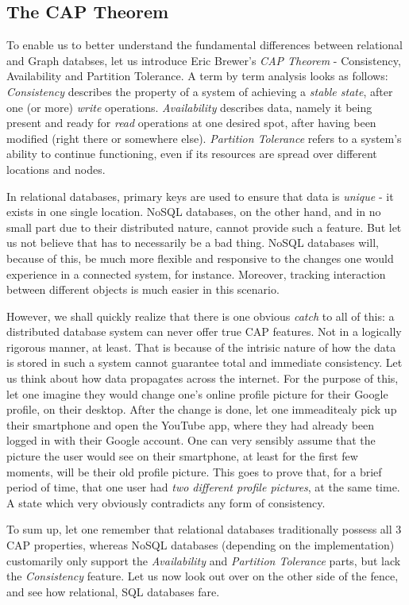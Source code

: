 \documentclass[10pt,        %
               a4paper,     %
               journal,     %
               ]{IEEEtran}
\begin{document}
\subsection{The CAP Theorem}
To enable us to better understand the fundamental differences between relational and Graph databses, let us introduce Eric Brewer's \textit{CAP Theorem} - Consistency, Availability and Partition Tolerance. \cite{brewer_cap_theorem} A term by term analysis looks as follows: \textit{Consistency} describes the property of a system of achieving a \textit{stable state}, after one (or more) \textit{write} operations. \textit{Availability} describes data, namely it being present and ready for \textit{read} operations at one desired spot, after having been modified (right there or somewhere else). \textit{Partition Tolerance} refers to a system's ability to continue functioning, even if its resources are spread over different locations and nodes. \par
In relational databases, primary keys are used to ensure that data is \textit{unique} - it exists in one single location. NoSQL databases, on the other hand, and in no small part due to their distributed nature, cannot provide such a feature. But let us not believe that has to necessarily be a bad thing. NoSQL databases will, because of this, be much more flexible and responsive to the changes one would experience in a connected system, for instance. Moreover, tracking interaction between different objects is much easier in this scenario. \par
However, we shall quickly realize that there is one obvious \textit{catch} to all of this: a distributed database system can never offer true CAP features. Not in a logically rigorous manner, at least. That is because of the intrisic nature of how the data is stored in such a system cannot guarantee total and immediate consistency. Let us think about how data propagates across the internet. For the purpose of this, let one imagine they would change one's online profile picture for their Google profile, on their desktop. After the change is done, let one immeaditealy pick up their smartphone and open the YouTube app, where they had already been logged in with their Google account. One can very sensibly assume that the picture the user would see on their smartphone, at least for the first few moments, will be their old profile picture. This goes to prove that, for a brief period of time, that one user had \textit{two different profile pictures}, at the same time. A state which very obviously contradicts any form of consistency. \par
To sum up, let one remember that relational databases traditionally possess all 3 CAP properties, whereas NoSQL databases (depending on the implementation) customarily only support the \textit{Availability} and \textit{Partition Tolerance} parts, but lack the \textit{Consistency} feature. Let us now look out over on the other side of the fence, and see how relational, SQL databases fare. \par
\end{document}

